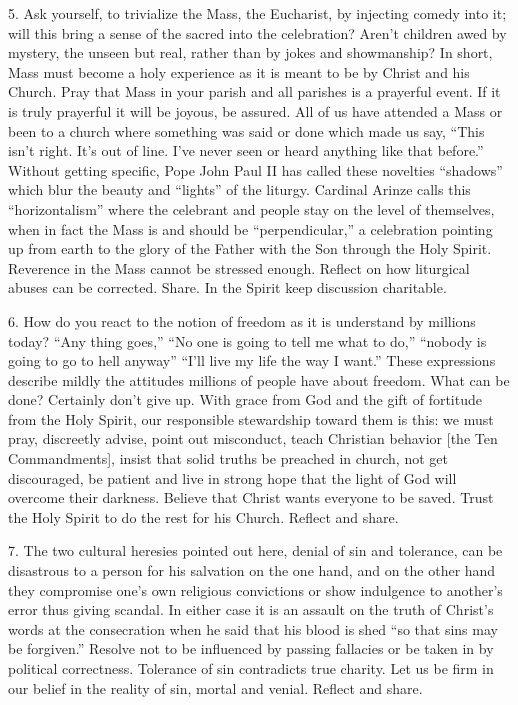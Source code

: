 \documentclass[oneside]{book}
\begin{document}
5. Ask yourself, to trivialize the Mass, the Eucharist, by injecting comedy into
it; will this bring a sense of the sacred into the celebration? Aren't children
awed by mystery, the unseen but real, rather than by jokes and showmanship? In
short, Mass must become a holy experience as it is meant to be by Christ and his
Church. Pray that Mass in your parish and all parishes is a prayerful event. If
it is truly prayerful it will be joyous, be assured. All of us have attended a
Mass or been to a church where something was said or done which made us say,
``This isn't right. It's out of line. I've never seen or heard anything like
that before.'' Without getting specific, Pope John Paul II has called these
novelties ``shadows'' which blur the beauty and ``lights'' of the
liturgy. Cardinal Arinze calls this ``horizontalism'' where the celebrant and
people stay on the level of themselves, when in fact the Mass is and should be
``perpendicular,'' a celebration pointing up from earth to the glory of the
Father with the Son through the Holy Spirit. Reverence in the Mass cannot be
stressed enough. Reflect on how liturgical abuses can be corrected. Share. In
the Spirit keep discussion charitable.

6. How do you react to the notion of freedom as it is understand by millions
today? ``Any thing goes,'' ``No one is going to tell me what to do,'' ``nobody
is going to go to hell anyway'' ``I'll live my life the way I want.'' These
expressions describe mildly the attitudes millions of people have about
freedom. What can be done? Certainly don't give up. With grace from God and the
gift of fortitude from the Holy Spirit, our responsible stewardship toward them
is this: we must pray, discreetly advise, point out misconduct, teach Christian
behavior [the Ten Commandments], insist that solid truths be preached in church,
not get discouraged, be patient and live in strong hope that the light of God
will overcome their darkness. Believe that Christ wants everyone to be
saved. Trust the Holy Spirit to do the rest for his Church. Reflect and share.

7. The two cultural heresies pointed out here, denial of sin and tolerance, can
be disastrous to a person for his salvation on the one hand, and on the other
hand they compromise one's own religious convictions or show indulgence to
another's error thus giving scandal. In either case it is an assault on the
truth of Christ's words at the consecration when he said that his blood is shed
``so that sins may be forgiven.'' Resolve not to be influenced by passing
fallacies or be taken in by political correctness. Tolerance of sin contradicts
true charity. Let us be firm in our belief in the reality of sin, mortal and
venial. Reflect and share.
\end{document}
